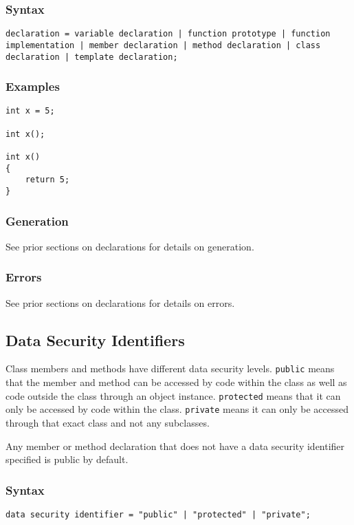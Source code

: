 \documentclass[10pt,a4paper]{article}
\begin{document}
\subsubsection{Syntax}
\begin{verbatim}
declaration = variable declaration | function prototype | function implementation | member declaration | method declaration | class declaration | template declaration;
\end{verbatim}

\subsubsection{Examples}
\begin{verbatim}
int x = 5;

int x();

int x()
{
    return 5;
}
\end{verbatim}

\subsubsection{Generation}
See prior sections on declarations for details on generation.

\subsubsection{Errors}
See prior sections on declarations for details on errors.

\newpage






\subsection{Data Security Identifiers}
\label{sec:DataSecurityIdentifiers}
Class members and methods have different data security levels. \verb|public| means that the member and method can be accessed by code within the class as well as code outside the class through an object instance. \verb|protected| means that it can only be accessed by code within the class. \verb|private| means it can only be accessed through that exact class and not any subclasses.

Any member or method declaration that does not have a data security identifier specified is public by default.

\subsubsection{Syntax}
\begin{verbatim}
data security identifier = "public" | "protected" | "private";
\end{verbatim}
\end{document}
